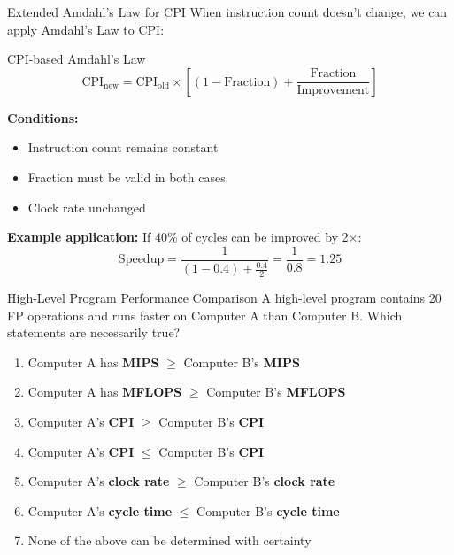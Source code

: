 \documentclass[aspectratio=169,12pt]{beamer}
\begin{document}
\begin{frame}{Extended Amdahl's Law for CPI}
When instruction count doesn't change, we can apply Amdahl's Law to CPI:

\begin{block}{CPI-based Amdahl's Law}
$$\text{CPI}_{\text{new}} = \text{CPI}_{\text{old}} \times \left[(1 - \text{Fraction}) + \frac{\text{Fraction}}{\text{Improvement}}\right]$$
\end{block}

\textbf{Conditions:}
\begin{itemize}
    \item Instruction count remains constant
    \item Fraction must be valid in both cases
    \item Clock rate unchanged
\end{itemize}

\textbf{Example application:}
If 40\% of cycles can be improved by 2×:
$$\text{Speedup} = \frac{1}{(1 - 0.4) + \frac{0.4}{2}} = \frac{1}{0.8} = 1.25$$
\end{frame}

\begin{frame}{High-Level Program Performance Comparison}
A high-level program contains 20 FP operations and runs faster on Computer A than Computer B. Which statements are necessarily true?

\begin{enumerate}
    \item Computer A has \textbf{MIPS} $\geq$ Computer B's \textbf{MIPS}
    \item Computer A has \textbf{MFLOPS} $\geq$ Computer B's \textbf{MFLOPS}
    \item Computer A's \textbf{CPI} $\geq$ Computer B's \textbf{CPI}
    \item Computer A's \textbf{CPI} $\leq$ Computer B's \textbf{CPI}
    \item Computer A's \textbf{clock rate} $\geq$ Computer B's \textbf{clock rate}
    \item Computer A's \textbf{cycle time} $\leq$ Computer B's \textbf{cycle time}
    \item None of the above can be determined with certainty
\end{enumerate}\end{frame}
\end{document}
